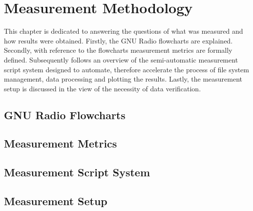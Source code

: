 \chapter{Measurement Methodology}

This chapter is dedicated to answering the questions of what was measured and how results were obtained. Firstly, the GNU Radio flowcharts are explained. Secondly, with reference to the flowcharts measurement metrics are formally defined. Subsequently follows an overview of the semi-automatic measurement script system designed to automate, therefore accelerate the process of file system management, data processing and plotting the results. Lastly, the measurement setup is discussed in the view of the necessity of data verification.

\section{GNU Radio Flowcharts}

\section{Measurement Metrics}

\section{Measurement Script System}

\section{Measurement Setup}